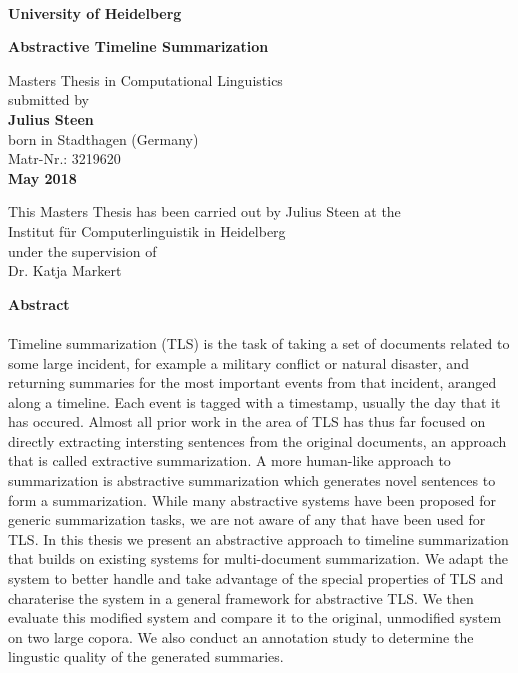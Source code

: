 \documentclass[a4paper,BCOR=10mm]{report}
\begin{document}
\begin{titlepage}
\begin{center}
 
\Large\textbf{\\
University of Heidelberg}
\vspace{2cm}

\Huge\textbf{
Abstractive Timeline Summarization
}

\vspace{10cm}

\normalsize
Masters Thesis in Computational Linguistics\\
submitted by\\
\vspace{0.5cm}
\Large\textbf{Julius Steen}\\
\normalsize
\vspace{0.5cm}
born in Stadthagen (Germany)\\
\normalsize
Matr-Nr.: 3219620 \\
\vspace{0.5cm}
\Large\textbf{May 2018} \\
\normalsize

\newpage

\normalsize
This Masters Thesis has been carried out by Julius Steen at the\\
Institut für Computerlinguistik in Heidelberg\\
under the supervision of\\
Dr. Katja Markert
\vfill
\end{center}

\newpage
\noindent
\Large\textbf{Abstract}\\
\\

Timeline summarization (TLS) is the task of taking a set of documents related to some large incident, for example a military conflict or natural disaster, and returning summaries for the most important events from that incident, aranged along a timeline. Each event is tagged with a timestamp, usually the day that it has occured.
Almost all prior work in the area of TLS has thus far focused on directly extracting intersting sentences from the original documents, an approach that is called extractive summarization. A more human-like approach to summarization is abstractive summarization which generates novel sentences to form a summarization. While many abstractive systems have been proposed for generic summarization tasks, we are not aware of any that have been used for TLS.
In this thesis we present an abstractive approach to timeline summarization that builds on existing systems for multi-document summarization. We adapt the system to better handle and take advantage of the special properties of TLS and charaterise the system in a general framework for abstractive TLS. We then evaluate this modified system and compare it to the original, unmodified system on two large copora.
We also conduct an annotation study to determine the lingustic quality of the generated summaries.



\end{titlepage}
\end{document}
